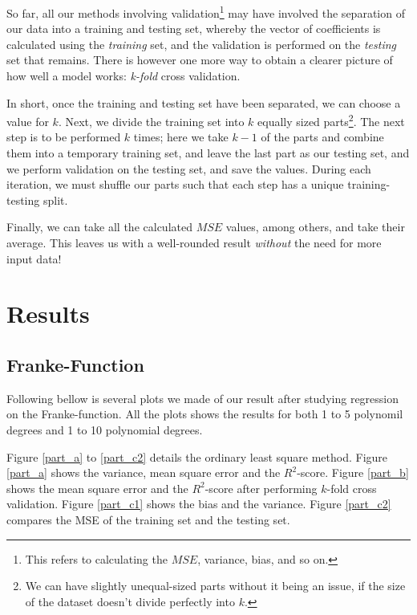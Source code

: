 \documentclass[a4paper,10pt,english]{article}
\begin{document}
So far, all our methods involving validation\footnote{This refers to calculating the $MSE$, variance, bias, and so on.} may have involved the separation of our data into a training and testing set, whereby the vector of coefficients is calculated using the \textit{training} set, and the validation is performed on the \textit{testing} set that remains.	There is however one more way to obtain a clearer picture of how well a model works: \textit{k-fold} cross validation.	

In short, once the training and testing set have been separated, we can choose a value for $k$.  Next, we divide the training set into $k$ equally sized parts\footnote{We can have slightly unequal-sized parts without it being an issue, if the size of the dataset doesn't divide perfectly into $k$.}.  The next step is to be performed $k$ times; here we take $k-1$ of the parts and combine them into a temporary training set, and leave the last part as our testing set, and we perform validation on the testing set, and save the values.  During each iteration, we must shuffle our parts such that each step has a unique training-testing split.

Finally, we can take all the calculated $MSE$ values, among others, and take their average.  This leaves us with a well-rounded result \textit{without} the need for more input data!



\section{Results}
\label{sec:results}

\subsection{Franke-Function}

Following bellow is several plots we made of our result after studying regression on the Franke-function. All the plots shows the results for both 1 to 5 polynomil degrees and 1 to 10 polynomial degrees. %

Figure \ref{part_a} to \ref{part_c2} details the ordinary least square method.
Figure \ref{part_a} shows the variance, mean square error and the $R^2$-score.
Figure \ref{part_b} shows the mean square error and the $R^2$-score after performing $k$-fold cross validation. 
Figure \ref{part_c1} shows the bias and the variance. 
Figure \ref{part_c2} compares the MSE of the training set and the testing set.
\end{document}
